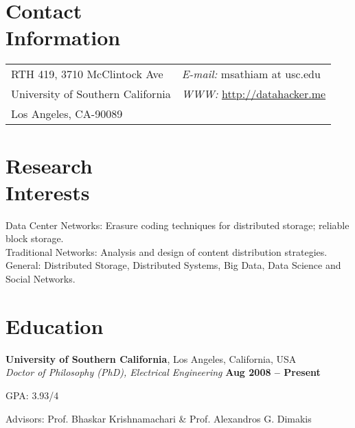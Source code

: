 \documentclass[margin,line]{resume}
\begin{document}
\begin{resume}


\section{\mysidestyle Contact\\Information}


\begin{tabular}{@{}p{4in}p{5in}}
RTH 419, 3710 McClintock Ave &  {\it E-mail:}  msathiam at usc.edu\\
University of Southern California & {\it WWW:} \href{http://datahacker.me}{http://datahacker.me} \\
Los Angeles, CA-90089 &      \\
\end{tabular}

    \section{\mysidestyle Research\\Interests}
	Data Center Networks: Erasure coding techniques for distributed storage; reliable block storage. \\
	Traditional Networks: Analysis and design of content distribution strategies.\\
	General: Distributed Storage, Distributed Systems, Big Data, Data Science and Social Networks.
    \section{\mysidestyle Education}

    \textbf{University of Southern California}, Los Angeles, California, USA \\%
    \textsl{Doctor of Philosophy (PhD), Electrical Engineering} \hfill \textbf{ Aug 2008 -- Present}\vspace{-3mm}\\\vspace{-1mm}
    \begin{list2}
        \item GPA: 3.93/4
        \item Advisors:  Prof. Bhaskar Krishnamachari \& Prof. Alexandros G. Dimakis
    \end{list2}\vspace{-1.5mm}
    

\end{resume}
\end{document}
